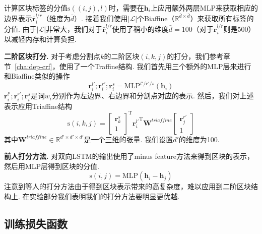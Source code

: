 计算区块标签的分值$\mathrm{s}((i,j),l)$时，需要在$\mathbf{h}_i$上应用额外两层MLP来获取相应的边界表示$\bar{\mathbf{r}}^{l/r}_i$（维度为$\bar{d}$）.
接着我们使用$|\mathcal{L}|$个Biaffine（$\mathbb{R}^{\bar{d} \times \bar{d}}$）来获取所有标签的分值.
由于$|\mathcal{L}|$非常大，我们对于$\bar{\mathbf{r}}^{l/r}_i$使用了稍小的维度$\bar{d}=100$（对于${\mathbf{r}}^{l/r}_i$则是500）以减轻内存和计算负担.

\noindent\textbf{二阶区块打分.}
对于考虑分割点$k$的二阶区块$(i,k,j)$的打分，我们参考章节~\ref{cha:dep-crf}，使用了一个Traffine结构.
我们首先用三个额外的MLP层来进行和Biaffine类似的操作
\begin{equation}
  \label{con-mlp-sib}
  \mathbf{r}_i^{l'}; \mathbf{r}_i^{r'}; \mathbf{r}_i^{s} =\mathrm{MLP}^{l'/r'/s} \left( \mathbf{h}_i \right)
\end{equation}
$\mathbf{r}_i^{l'}; \mathbf{r}_i^{r'}; \mathbf{r}_i^{s}$是词$w_i$分别作为左边界、右边界和分割点对应的表示.
然后，我们对上述表示应用Triaffine结构
\begin{equation} \label{eq:con-triaffine}
  \mathrm{s}(i,k,j) =
  \left[
    \begin{array}{c}
      \mathbf{r}_{k}^{s} \\
      1
    \end{array}
    \right]^\mathrm{T}
  {\mathbf{r}_{i}^{l'}}^\mathrm{T}
  \mathbf{W}^\textit{triaffine}
  \left[
    \begin{array}{c}
      \mathbf{r}_{j}^{r'} \\
      1
    \end{array}
    \right]
\end{equation}
其中$\mathbf{W}^\textit{triaffine} \in \mathbb{R}^{d' \times d' \times d'}$是一个三维的张量.
我们设置$d'$的维度为100.

\noindent\textbf{前人打分方法.}
\citep{stern-etal-2017-minimal}对双向LSTM的输出使用了minus feature方法来得到区块的表示\citep{wang-chang-2016-graph,cross-huang-2016-span}，然后用MLP层得到区块的分值.
\begin{equation} \label{eq:minus-score}
  \mathrm{s}(i,j)=\mathrm{MLP}(\mathbf{h}_{i}-\mathbf{h}_{j})
\end{equation}
注意到\citep{stern-etal-2017-minimal}等人的打分方法由于得到区块表示带来的高复杂度，难以应用到二阶区块结构上.
在实验部分我们表明我们的打分方法要明显更优越.

\subsection{训练损失函数}

